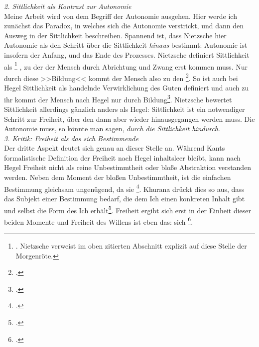 \documentclass[12pt, a4paper, openany]{report}
\begin{document}
\emph{2. Sittlichkeit als Kontrast zur Autonomie}\\
Meine Arbeit wird von dem Begriff der Autonomie ausgehen. 
Hier werde ich zunächst das Paradox, in welches sich die Autonomie verstrickt, und dann den Ausweg in der Sittlichkeit beschreiben.
Spannend ist, dass Nietzsche hier Autonomie als den Schritt über die Sittlichkeit \emph{hinaus} bestimmt:
Autonomie ist insofern der Anfang, und das Ende des Prozesses.
Nietzsche definiert Sittlichkeit als %
\footnote{
    \cite[][22]{nietzsche_morgenrote_1999}. 
    Nietzsche verweist im oben zitierten Abschnitt explizit auf diese Stelle der Morgenröte.
}%
, zu der der Mensch durch Abrichtung und Zwang erst kommen muss.
Nur durch diese >>Bildung<< kommt der Mensch also zu den \footcite[][297]{nietzsche_jenseits_2014}. 
So ist auch bei Hegel Sittlichkeit als handelnde Verwirklichung des Guten definiert und auch zu ihr kommt der Mensch nach Hegel nur durch Bildung\footcite[Vergleiche dazu etwa:][§ 187, S. 191]{hegel_grundlinien_2017}.
Nietzsche bewertet Sittlichkeit allerdings gänzlich anders als Hegel:
Sittlichkeit ist ein notwendiger Schritt zur Freiheit, über den dann aber wieder hinausgegangen werden muss.
Die Autonomie muss, so könnte man sagen, \emph{durch die Sittlichkeit hindurch}.\\

\emph{3. Kritik: Freiheit als das sich Bestimmende}\\
Der dritte Aspekt deutet sich genau an dieser Stelle an. 
Während Kants formalistische Definition der Freiheit nach Hegel inhaltsleer bleibt, kann nach Hegel Freiheit nicht als reine Unbestimmtheit oder bloße Abstraktion verstanden werden.
Neben dem Moment der bloßen Unbestimmtheit, ist die einfachen Bestimmung gleichsam ungenügend, da sie \footcite[][§ 6 (Anmerkung), S. 39]{hegel_grundlinien_2017}.
Khurana drückt dies so aus, dass das Subjekt einer Bestimmung bedarf, die dem Ich einen konkreten Inhalt gibt und selbst die Form des Ich erhält\footcite[Vgl.][285]{khurana_freiheit_2017}. 
Freiheit ergibt sich erst in der Einheit dieser beiden Momente und Freiheit des Willens ist eben das: sich \footcite[][40, §7]{hegel_grundlinien_2017}.\\
\end{document}
